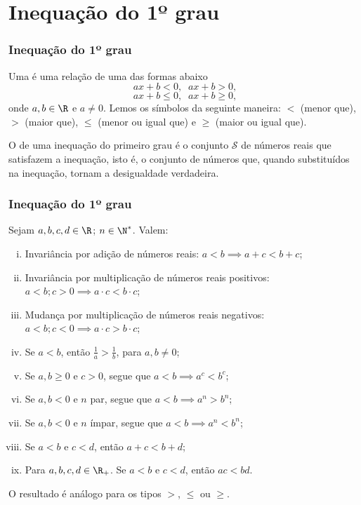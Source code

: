 
\section{Inequação do 1º grau}
\begin{frame}
\frametitle{Inequação do 1º grau} %

\begin{definicao}
Uma  é uma relação de uma das formas
abaixo $$ax+b <0, \; \; ax+b>0,$$ $$ax+b \leq 0, \; \; ax+b \geq
0,$$ onde $a, b \in \R$ e $ a \neq 0$. Lemos os símbolos da seguinte
maneira: $<$ (menor que), $>$ (maior que), $\leq$ (menor ou igual
que) e $\geq$ (maior ou igual que).
\end{definicao}

O  de uma inequação do primeiro grau é o
conjunto $\mathcal{S}$ de números reais que satisfazem a inequação,
isto é, o conjunto de números que, quando substituídos na inequação,
tornam a desigualdade verdadeira.

\end{frame}


\begin{frame}
\frametitle{Inequação do 1º grau} %

\begin{proposicao}
Sejam $a, b, c, d \in \R$; $n \in \N^*$. Valem:
\begin{enumerate}[i.]
	\item Invariância por adição de números reais: $a < b \implies a+c < b+c$;
	\item Invariância por multiplicação de números reais positivos:
	$a < b ; c>0 \implies a \cdot c < b \cdot c$;
	\item Mudança por multiplicação de números reais
	negativos: $a < b ; c<0 \implies a \cdot c > b \cdot c$;
	\item Se $a < b$, então $\frac 1 a > \frac 1 b$, para $a, b \neq
	0$;
	\item Se $a,b \geq 0$ e $c>0$, segue que $a < b \implies a^c < b^c$;
	\item Se $a,b < 0$ e $n$ par, segue que $a < b \implies a^n > b^n$;
	\item Se $a,b < 0$ e $n$ ímpar, segue que $a < b \implies a^n <
	b^n$;
	\item Se $a< b$ e $c< d$, então $a+c < b+d$;
	\item Para $a, b, c, d \in \R_+$. Se $a< b$ e $c< d$, então $ac < bd$.
\end{enumerate}
O resultado é análogo para os tipos $>$, $\leq$ ou $\geq$.
\end{proposicao}


\end{frame}


